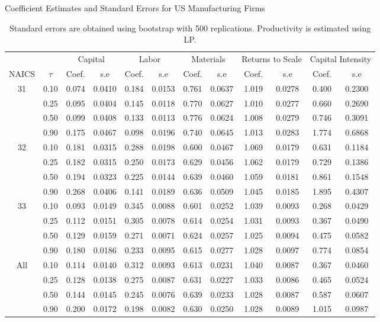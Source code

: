 \documentclass[11pt]{article}
\begin{document}
\begin{table}[H]
\centering
\caption{Coefficient Estimates and Standard Errors for US Manufacturing Firms}
\begin{tabular}{cccccccccccc}
  \hline\hline & & \multicolumn{2}{c}{Capital}  & \multicolumn{2}{c}{Labor} & \multicolumn{2}{c}{Materials} & \multicolumn{2}{c}{Returns to Scale} & \multicolumn{2}{c}{Capital Intensity}\\ \cmidrule(lr){3-4} \cmidrule(lr){5-6} \cmidrule(lr){7-8} \cmidrule(lr){9-10} \cmidrule(lr){11-12}NAICS & $\tau$ & Coef. & s.e & Coef. & s.e & Coef. & s.e & Coef. & s.e & Coef. & s.e \\ 
  \hline
31 & 0.10 & 0.074 & 0.0410 & 0.184 & 0.0153 & 0.761 & 0.0637 & 1.019 & 0.0278 & 0.400 & 0.2300 \\ 
   & 0.25 & 0.095 & 0.0404 & 0.145 & 0.0118 & 0.770 & 0.0627 & 1.010 & 0.0277 & 0.660 & 0.2690 \\ 
   & 0.50 & 0.099 & 0.0408 & 0.133 & 0.0113 & 0.776 & 0.0624 & 1.008 & 0.0279 & 0.746 & 0.3091 \\ 
   & 0.90 & 0.175 & 0.0467 & 0.098 & 0.0196 & 0.740 & 0.0645 & 1.013 & 0.0283 & 1.774 & 0.6868 \\ 
  32 & 0.10 & 0.181 & 0.0315 & 0.288 & 0.0198 & 0.600 & 0.0467 & 1.069 & 0.0179 & 0.631 & 0.1184 \\ 
   & 0.25 & 0.182 & 0.0315 & 0.250 & 0.0173 & 0.629 & 0.0456 & 1.062 & 0.0179 & 0.729 & 0.1386 \\ 
   & 0.50 & 0.194 & 0.0323 & 0.225 & 0.0144 & 0.639 & 0.0460 & 1.059 & 0.0181 & 0.861 & 0.1548 \\ 
   & 0.90 & 0.268 & 0.0406 & 0.141 & 0.0189 & 0.636 & 0.0509 & 1.045 & 0.0185 & 1.895 & 0.4307 \\ 
  33 & 0.10 & 0.093 & 0.0149 & 0.345 & 0.0088 & 0.601 & 0.0252 & 1.039 & 0.0093 & 0.268 & 0.0429 \\ 
   & 0.25 & 0.112 & 0.0151 & 0.305 & 0.0078 & 0.614 & 0.0254 & 1.031 & 0.0093 & 0.367 & 0.0490 \\ 
   & 0.50 & 0.129 & 0.0159 & 0.271 & 0.0071 & 0.624 & 0.0257 & 1.025 & 0.0094 & 0.475 & 0.0582 \\ 
   & 0.90 & 0.180 & 0.0186 & 0.233 & 0.0095 & 0.615 & 0.0277 & 1.028 & 0.0097 & 0.774 & 0.0854 \\ 
  All & 0.10 & 0.114 & 0.0140 & 0.312 & 0.0093 & 0.613 & 0.0231 & 1.040 & 0.0087 & 0.367 & 0.0460 \\ 
   & 0.25 & 0.128 & 0.0138 & 0.275 & 0.0087 & 0.631 & 0.0227 & 1.033 & 0.0086 & 0.465 & 0.0524 \\ 
   & 0.50 & 0.144 & 0.0145 & 0.245 & 0.0076 & 0.639 & 0.0233 & 1.028 & 0.0087 & 0.587 & 0.0607 \\ 
   & 0.90 & 0.200 & 0.0172 & 0.198 & 0.0082 & 0.630 & 0.0250 & 1.028 & 0.0089 & 1.015 & 0.0987 \\ 
   \hline
\end{tabular}
\caption*{\footnotesize Standard errors are obtained using bootstrap with 500 replications. Productivity is estimated using LP.}
\end{table}
\end{document}
